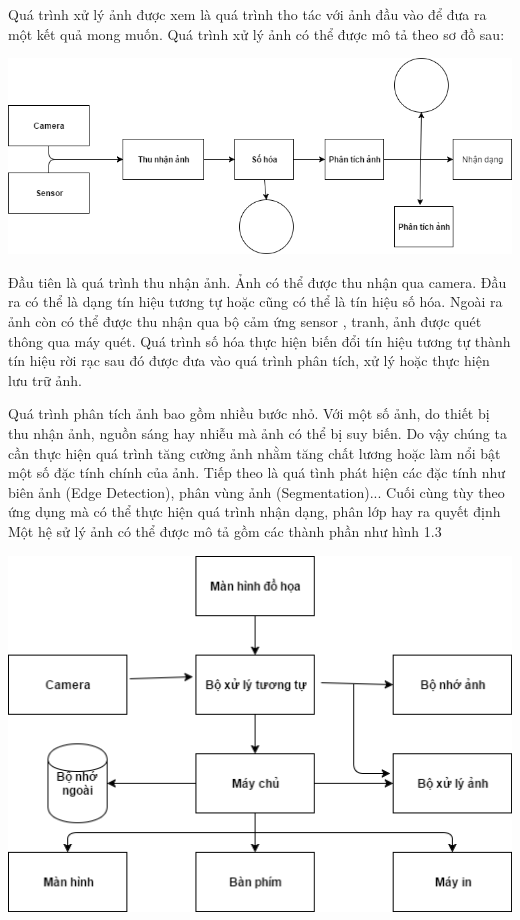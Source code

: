\documentclass[14pt,oneside,a4paper]{extreport}
\begin{document}
Quá trình xử lý ảnh được xem là quá trình tho tác với ảnh đầu vào để đưa ra một kết quả mong muốn. Quá trình xử lý ảnh có thể được mô tả theo sơ đồ sau:
\begin{center}
\includegraphics[scale=0.5]{figure/quatrinh.png}
\end{center}
Đầu tiên là quá trình thu nhận ảnh. Ảnh có thể được thu nhận qua camera. Đầu ra có thể là dạng tín hiệu tương tự hoặc cũng có thể là tín hiệu số hóa. Ngoài ra ảnh còn có thể được thu nhận qua bộ cảm ứng sensor , tranh, ảnh được quét thông qua máy quét.
Quá trình số hóa thực hiện biến đổi tín hiệu tương tự thành tín hiệu rời rạc sau đó được đưa vào quá trình phân tích, xử lý hoặc thực hiện lưu trữ ảnh.

Quá trình phân tích ảnh bao gồm nhiều bước nhỏ. Với một số ảnh, do thiết bị thu nhận ảnh, nguồn sáng hay nhiễu mà ảnh có thể bị suy biến. Do vậy chúng ta cần thực hiện quá trình tăng cường ảnh nhằm tăng chất lương hoặc làm nổi bật một số đặc tính chính của ảnh. Tiếp theo là quá tình phát hiện các đặc tính như biên ảnh (Edge Detection), phân vùng ảnh (Segmentation)...
Cuối cùng tùy theo ứng dụng mà có thể thực hiện quá trình nhận dạng, phân lớp hay ra quyết định 
Một hệ sử lý ảnh có thể được mô tả gồm các thành phần như hình 1.3
\begin{center}
\includegraphics[scale=0.7]{figure/hethong.png}
\end{center}
\end{document}
